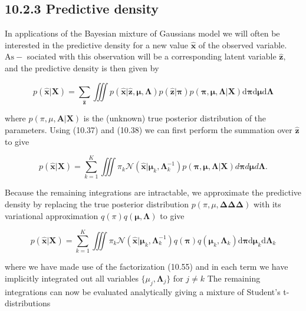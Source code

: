 \documentclass[
  10
]{article}
\begin{document}
\subsection{10.2.3 Predictive density}\label{predictive-density}

In applications of the Bayesian mixture of Gaussians model we will often
be interested in the predictive density for a new value
\(\widehat { \mathbf { x } }\) of the observed variable.
\({ \mathrm { A s } } -\) sociated with this observation will be a
corresponding latent variable \({ \widehat { \mathbf { z } } } ,\) and
the predictive density is then given by

\[
p (\widehat {\mathbf {x}} | \mathbf {X}) = \sum_ {\widehat {\mathbf {z}}} \iiint p (\widehat {\mathbf {x}} | \widehat {\mathbf {z}}, \boldsymbol {\mu}, \boldsymbol {\Lambda}) p (\widehat {\mathbf {z}} | \boldsymbol {\pi}) p (\boldsymbol {\pi}, \boldsymbol {\mu}, \boldsymbol {\Lambda} | \mathbf {X}) \mathrm{d} \boldsymbol {\pi} \mathrm{d} \boldsymbol {\mu} \mathrm{d} \boldsymbol {\Lambda}\tag{10.78}
\]

where \(p ( \pi , \mu , \mathbf { A } | \mathbf { X } )\) is the
(unknown) true posterior distribution of the parameters. Using (10.37)
and (10.38) we can first perform the summation over
\(\widehat { \mathbf { z } }\) to give

\[
p (\widehat {\mathbf {x}} | \mathbf {X}) = \sum_ {k = 1} ^ {K} \iiint \pi_ {k} \mathcal {N} \left(\widehat {\mathbf {x}} | \boldsymbol {\mu} _ {k}, \boldsymbol {\Lambda} _ {k} ^ {- 1}\right) p (\boldsymbol {\pi}, \boldsymbol {\mu}, \boldsymbol {\Lambda} | \mathbf {X}) d \boldsymbol {\pi} d \boldsymbol {\mu} d \boldsymbol {\Lambda}.\tag{10.79}
\]

Because the remaining integrations are intractable, we approximate the
predictive density by replacing the true posterior distribution
\(p ( \pi , \mu , \mathbf { \Delta } \mathbf { \Delta } \mathbf { \Delta } )\)
with its variational approximation
\(q ( \pi ) q ( \pmb { \mu } , \pmb { \Lambda } )\) to give

\[
p (\widehat {\mathbf {x}} | \mathbf {X}) = \sum_ {k = 1} ^ {K} \iiint \pi_ {k} \mathcal {N} \left(\widehat {\mathbf {x}} | \boldsymbol {\mu} _ {k}, \boldsymbol {\Lambda} _ {k} ^ {- 1}\right) q (\boldsymbol {\pi}) q (\boldsymbol {\mu} _ {k}, \boldsymbol {\Lambda} _ {k}) \mathrm{d} \boldsymbol {\pi} \mathrm{d} \boldsymbol {\mu} _ {k} \mathrm{d} \boldsymbol {\Lambda} _ {k}\tag{10.80}
\]

where we have made use of the factorization (10.55) and in each term we
have implicitly integrated out all variables
\(\{ \mu _ { j } , \pmb { \Lambda } _ { j } \}\) for \(j \neq k\) The
remaining integrations can now be evaluated analytically giving a
mixture of Student's t-distributions
\end{document}
